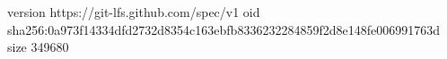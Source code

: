 version https://git-lfs.github.com/spec/v1
oid sha256:0a973f14334dfd2732d8354c163ebfb8336232284859f2d8e148fe006991763d
size 349680
